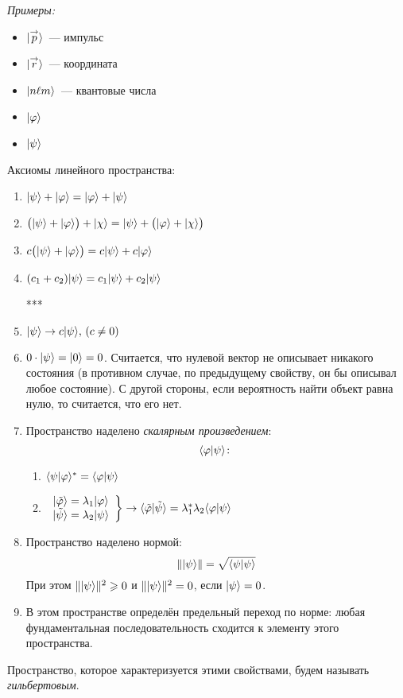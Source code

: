 \emph{Примеры:}
\begin{itemize}
  \item $| \overset{\to}{p} \rangle$~--- импульс
  \item $| \overset{\to}{r} \rangle$~--- координата
  \item $| n \ell m \rangle$~--- квантовые числа
  \item $| \varphi \rangle$
  \item $| \psi \rangle$
\end{itemize}
Аксиомы линейного пространства:
\begin{enumerate}
  \item $| \psi \rangle + | \varphi \rangle = | \varphi \rangle + | \psi \rangle$
  \item $\big(| \psi \rangle + | \varphi \rangle\big) + | \chi \rangle = | \psi \rangle + \big(| \varphi \rangle + | \chi \rangle\big)$
  \item $c \big(| \psi \rangle + | \varphi \rangle\big) = c | \psi \rangle + c | \varphi \rangle$
  \item $(c_1 + c_2) | \psi \rangle = c_1 | \psi \rangle + c_2 | \psi \rangle$

  ***
  \item $| \psi \rangle \to c | \psi \rangle ,\, (c \neq 0)$
  \item $0 \cdot | \psi \rangle = | 0 \rangle = 0$. Считается, что нулевой вектор не описывает никакого состояния (в противном случае, по предыдущему свойству, он бы описывал любое состояние). С другой стороны, если вероятность найти объект равна нулю, то считается, что его нет.
  \item Пространство наделено \emph{скалярным произведением}:
  $$
    \langle \varphi | \psi \rangle \colon
  $$
  \begin{enumerate}
    \item $\langle \psi | \varphi \rangle^\ast = \langle \varphi | \psi \rangle$
    \item $
        \left.
        \begin{array}{c}
          | \tilde {\varphi} \rangle = \lambda_1 | \varphi \rangle \\
          | \tilde \psi \rangle = \lambda_2 | \psi \rangle
        \end{array}
        \right\} \to
        \langle \tilde {\varphi} | \tilde \psi \rangle = \lambda_1^\ast \lambda_2 \langle \varphi | \psi \rangle
    $
  \end{enumerate}
  \item Пространство наделено нормой:
  $$
    \| | \psi \rangle \| = \sqrt{\langle \psi | \psi \rangle}
  $$
  При этом $\| | \psi \rangle \| ^2 \geqslant 0$ и $\| | \psi \rangle \| ^2 = 0$, если $| \psi \rangle = 0$.
  \item В этом пространстве определён предельный переход по норме: любая фундаментальная последовательность сходится к элементу этого пространства.
\end{enumerate}
Пространство, которое характеризуется этими свойствами, будем называть \emph{гильбертовым}. 

